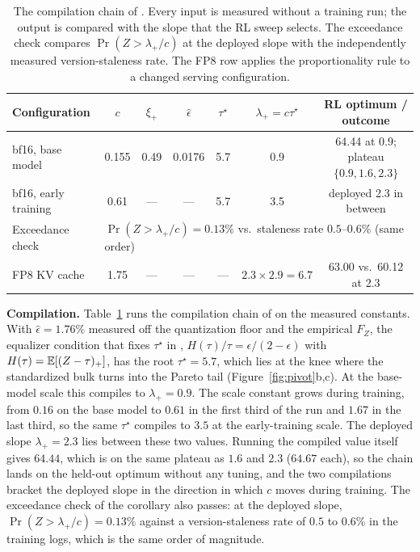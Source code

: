 \begin{table}[h]
\centering
\caption{The compilation chain of . Every input is measured without a training run; the output is compared with the slope that the RL sweep selects. The exceedance check compares $\Pr(Z>\lambda_+/c)$ at the deployed slope with the independently measured version-staleness rate. The FP8 row applies the proportionality rule to a changed serving configuration.}
\label{tab:compile}
\footnotesize\setlength{\tabcolsep}{3.5pt}
\begin{tabular}{lcccccc}
\toprule
Configuration & $c$ & $\xi_+$ & $\hat\epsilon$ & $\tau^\star$ & $\lambda_+=c\tau^\star$ & RL optimum / outcome \\
\midrule
bf16, base model & 0.155 & 0.49 & 0.0176 & 5.7 & 0.9 & 64.44 at 0.9; plateau $\{0.9,1.6,2.3\}$ \\
bf16, early training & 0.61 & --- & --- & 5.7 & 3.5 & deployed 2.3 in between \\
Exceedance check & \multicolumn{6}{l}{$\Pr(Z>\lambda_+/c)=0.13\%$ vs.\ staleness rate $0.5$--$0.6\%$ (same order)} \\
FP8 KV cache & 1.75 & --- & --- & --- & $2.3\times2.9=6.7$ & 63.00 vs.\ 60.12 at 2.3 \\
\bottomrule
\end{tabular}
\end{table}

\noindent\textbf{Compilation.}
Table~\ref{tab:compile} runs the compilation chain of  on the measured constants. With $\hat\epsilon=1.76\%$ measured off the quantization floor and the empirical $F_Z$, the equalizer condition that fixes $\tau^\star$ in , $H(\tau)/\tau=\epsilon/(2-\epsilon)$ with $H(\tau)=\mathbb{E}[(Z-\tau)_+]$, has the root $\tau^\star=5.7$, which lies at the knee where the standardized bulk turns into the Pareto tail (Figure~\ref{fig:pivot}b,c). At the base-model scale this compiles to $\lambda_+=0.9$. The scale constant grows during training, from $0.16$ on the base model to $0.61$ in the first third of the run and $1.67$ in the last third, so the same $\tau^\star$ compiles to $3.5$ at the early-training scale. The deployed slope $\lambda_+=2.3$ lies between these two values. Running the compiled value itself gives $64.44$, which is on the same plateau as $1.6$ and $2.3$ ($64.67$ each), so the chain lands on the held-out optimum without any tuning, and the two compilations bracket the deployed slope in the direction in which $c$ moves during training. The exceedance check of the corollary also passes: at the deployed slope, $\Pr(Z>\lambda_+/c)=0.13\%$ against a version-staleness rate of $0.5$ to $0.6\%$ in the training logs, which is the same order of magnitude.

